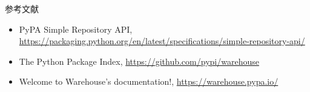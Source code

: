 \documentclass[presentation]{beamer}
\begin{document}
\begin{frame}[label={sec:orgcd55aa7}]{参考文献}
\begin{itemize}
\item PyPA Simple Repository API, \url{https://packaging.python.org/en/latest/specifications/simple-repository-api/}
\item The Python Package Index, \url{https://github.com/pypi/warehouse}
\item Welcome to Warehouse's documentation!, \url{https://warehouse.pypa.io/}
\end{itemize}
\end{frame}
\end{document}
